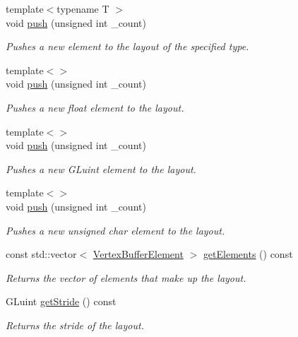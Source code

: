 \begin{DoxyCompactItemize}
\item 
{\footnotesize template$<$typename T $>$ }\\void \hyperlink{class_cookie_eng_1_1_graphics_1_1_vertex_buffer_layout_a8d9958c85411d75d7f412b2d3f7b566a}{push} (unsigned int \+\_\+count)
\begin{DoxyCompactList}\small\item\em Pushes a new element to the layout of the specified type. \end{DoxyCompactList}\item 
{\footnotesize template$<$$>$ }\\void \hyperlink{class_cookie_eng_1_1_graphics_1_1_vertex_buffer_layout_a3f1a639714762ec45edf48a68995d7bd}{push} (unsigned int \+\_\+count)
\begin{DoxyCompactList}\small\item\em Pushes a new float element to the layout. \end{DoxyCompactList}\item 
{\footnotesize template$<$$>$ }\\void \hyperlink{class_cookie_eng_1_1_graphics_1_1_vertex_buffer_layout_a3f1a639714762ec45edf48a68995d7bd}{push} (unsigned int \+\_\+count)
\begin{DoxyCompactList}\small\item\em Pushes a new G\+Luint element to the layout. \end{DoxyCompactList}\item 
{\footnotesize template$<$$>$ }\\void \hyperlink{class_cookie_eng_1_1_graphics_1_1_vertex_buffer_layout_a3f1a639714762ec45edf48a68995d7bd}{push} (unsigned int \+\_\+count)
\begin{DoxyCompactList}\small\item\em Pushes a new unsigned char element to the layout. \end{DoxyCompactList}\item 
const std\+::vector$<$ \hyperlink{struct_cookie_eng_1_1_graphics_1_1_vertex_buffer_element}{Vertex\+Buffer\+Element} $>$ \hyperlink{class_cookie_eng_1_1_graphics_1_1_vertex_buffer_layout_a082cc08b182cabe19998ae522c0466be}{get\+Elements} () const
\begin{DoxyCompactList}\small\item\em Returns the vector of elements that make up the layout. \end{DoxyCompactList}\item 
G\+Luint \hyperlink{class_cookie_eng_1_1_graphics_1_1_vertex_buffer_layout_a4c771d06898767d1a92237b03a53e887}{get\+Stride} () const
\begin{DoxyCompactList}\small\item\em Returns the stride of the layout. \end{DoxyCompactList}\end{DoxyCompactItemize}
